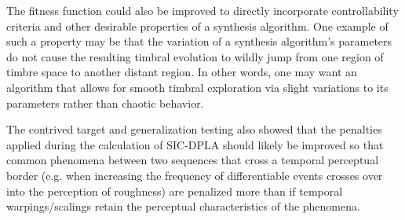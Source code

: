 \documentclass[a4paper,12pt]{report} 	%
\numberwithin{figure}{chapter}
\numberwithin{table}{chapter}
\numberwithin{equation}{chapter}
\begin{document}
\begin{flushleft}
The fitness function could also be improved to directly incorporate controllability criteria and other desirable properties of a synthesis algorithm. One example of such a property may be that the variation of a synthesis algorithm's parameters do not cause the resulting timbral evolution to wildly jump from one region of timbre space to another distant region. In other words, one may want an algorithm that allows for smooth timbral exploration via slight variations to its parameters rather than chaotic behavior.

The contrived target and generalization testing also showed that the penalties applied during the calculation of SIC-DPLA should likely be improved so that common phenomena between two sequences that cross a temporal perceptual border (e.g. when increasing the frequency of differentiable events crosses over into the perception of roughness) are penalized more than if temporal warpings/scalings retain the perceptual characteristics of the phenomena.

\newpage
\nocite{*}	%
\end{flushleft}
\end{document}
